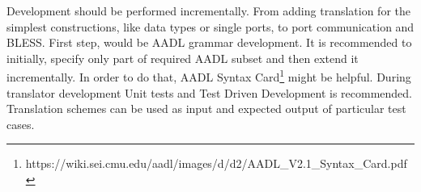 Development should be performed incrementally. From adding translation for the simplest constructions, like data types or single ports, to port communication and BLESS. First step, would be AADL grammar development. It is recommended to initially, specify only part of required AADL subset and then extend it incrementally. In order to do that, AADL Syntax Card\footnote{https://wiki.sei.cmu.edu/aadl/images/d/d2/AADL\_V2.1\_Syntax\_Card.pdf} might be helpful. During translator development Unit tests and Test Driven Development is recommended. Translation schemes can be used as input and expected output of particular test cases. 


